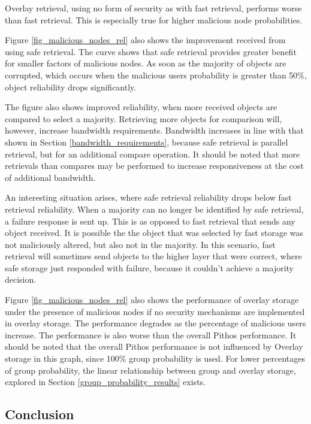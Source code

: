 Overlay retrieval, using no form of security as with fast retrieval, performs worse than fast retrieval. This is especially true for higher malicious node probabilities.

Figure \ref{fig_malicious_nodes_rel} also shows the improvement received from using safe retrieval. The curve shows that safe retrieval provides greater benefit for smaller factors of malicious nodes. As soon as the majority of objects are corrupted, which occurs when the malicious users probability is greater than 50\%, object reliability drops significantly.

The figure also shows improved reliability, when more received objects are compared to select a majority. Retrieving more objects for comparison will, however, increase bandwidth requirements. Bandwidth increases in line with that shown in Section \ref{bandwidth_requirements}, because safe retrieval is parallel retrieval, but for an additional compare operation. It should be noted that more retrievals than compares may be performed to increase responsiveness at the cost of additional bandwidth.

An interesting situation arises, where safe retrieval reliability drops below fast retrieval reliability. When a majority can no longer be identified by safe retrieval, a failure response is sent up. This is as opposed to fast retrieval that sends any object received. It is possible the the object that was selected by fast storage was not maliciously altered, but also not in the majority. In this scenario, fast retrieval will sometimes send objects to the higher layer that were correct, where safe storage just responded with failure, because it couldn't achieve a majority decision.

Figure \ref{fig_malicious_nodes_rel} also shows the performance of overlay storage under the presence of malicious nodes if no security mechanisms are implemented in overlay storage. The performance degrades as the percentage of malicious users increase. The performance is also worse than the overall Pithos performance.  It should be noted that the overall Pithos performance is not influenced by Overlay storage in this graph, since 100\% group probability is used. For lower percentages of group probability, the linear relationship between group and overlay storage, explored in Section \ref{group_probability_results} exists.

\subsection{Conclusion}

